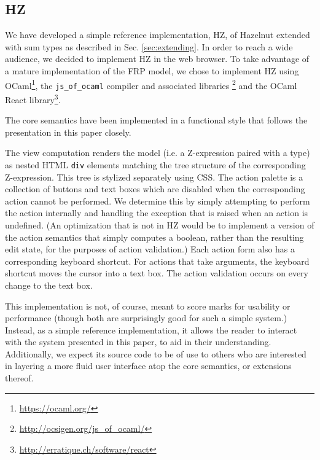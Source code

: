 \subsection{HZ}
We have developed a simple reference implementation, HZ, of Hazelnut extended with sum types as described in Sec. \ref{sec:extending}.  In
order to reach a wide audience, we decided to implement HZ in the web
browser.  To take advantage of a mature implementation of the FRP
model, we chose to implement HZ using
OCaml\footnote{\url{https://ocaml.org/}}, the \texttt{js\_of\_ocaml}
compiler and associated libraries
\cite{DBLP:conf/ml/Balat06}\footnote{\url{http://ocsigen.org/js\_of\_ocaml/}}
and the OCaml React
library\footnote{\url{http://erratique.ch/software/react}}.

The core semantics have
been implemented in a functional style that follows the presentation in this paper closely.

The view computation renders the model (i.e. a Z-expression paired with a type) as nested HTML \texttt{div} elements matching the tree structure of the corresponding Z-expression. This tree is stylized separately using CSS. The action palette is a collection of buttons and text boxes which
are disabled when the corresponding action cannot be performed. We determine this by simply attempting to perform the
action internally and handling the exception that is raised when an action
is undefined. (An optimization that is not in HZ would be to implement a version of the action semantics that simply computes a boolean, rather than the resulting edit state, for the purposes of action validation.) Each action form also has a corresponding keyboard shortcut. For actions that take arguments, the keyboard shortcut moves the cursor into a text box. The action validation occurs on every change to the text box.

This implementation is not, of course, meant to score marks for
usability or performance (though both are surprisingly good for such a simple system.) Instead, as a simple reference implementation, it allows the reader to interact with the system presented in this paper, to aid in their understanding.  Additionally, we expect its source code to be of use to others who are interested in
layering a more fluid user interface atop the core semantics, or extensions thereof. 

